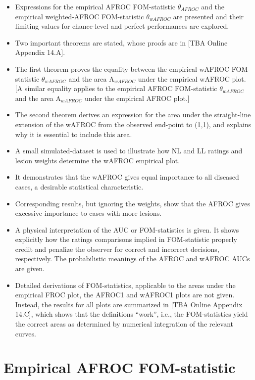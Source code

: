 \documentclass[
]{book}
\begin{document}
\begin{itemize}
\item
  Expressions for the empirical AFROC FOM-statistic \(\theta_{AFROC}\) and the empirical weighted-AFROC FOM-statistic \(\theta_{wAFROC}\) are presented and their limiting values for chance-level and perfect performances are explored.
\item
  Two important theorems are stated, whose proofs are in {[}TBA Online Appendix 14.A{]}.
\item
  The first theorem proves the equality between the empirical wAFROC FOM-statistic \(\theta_{wAFROC}\) and the area \(\text{A}_{wAFROC}\) under the empirical wAFROC plot. {[}A similar equality applies to the empirical AFROC FOM-statistic \(\theta_{wAFROC}\) and the area \(\text{A}_{wAFROC}\) under the empirical AFROC plot.{]}
\item
  The second theorem derives an expression for the area under the straight-line extension of the wAFROC from the observed end-point to (1,1), and explains why it is essential to include this area.
\item
  A small simulated-dataset is used to illustrate how NL and LL ratings and lesion weights determine the wAFROC empirical plot.
\item
  It demonstrates that the wAFROC gives equal importance to all diseased cases, a desirable statistical characteristic.
\item
  Corresponding results, but ignoring the weights, show that the AFROC gives excessive importance to cases with more lesions.
\item
  A physical interpretation of the AUC or FOM-statistics is given. It shows explicitly how the ratings comparisons implied in FOM-statistic properly credit and penalize the observer for correct and incorrect decisions, respectively. The probabilistic meanings of the AFROC and wAFROC AUCs are given.
\item
  Detailed derivations of FOM-statistics, applicable to the areas under the empirical FROC plot, the AFROC1 and wAFROC1 plots are not given. Instead, the results for all plots are summarized in {[}TBA Online Appendix 14.C{]}, which shows that the definitions ``work'', i.e., the FOM-statistics yield the correct areas as determined by numerical integration of the relevant curves.
\end{itemize}

\hypertarget{froc-meanings-afroc}{%
\section{Empirical AFROC FOM-statistic}\label{froc-meanings-afroc}}
\end{document}
